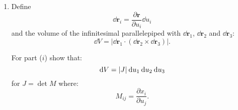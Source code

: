\begin{enumerate}
\begin{proof}
    \newpage

    Then multiply both sides by $\ell_{in}$:
    $$T'_{ijk}\ell_{jk}\ell_{km}\ell_{in}=
    \ell_{ij}\ell_{in}T_{jkm}.$$
    $$\therefore T'_{ijk}\ell_{jk}\ell_{km}\ell_{in}=
    \delta_{jn}T_{jkm}$$
    $$\therefore T'_{ijk}\ell_{jk}\ell_{km}\ell_{in}=T_{nkm}$$
    $$\therefore T'_{ijk}\ell_{in}\ell_{jk}\ell_{km}=T_{nkm}$$
    And this is by definition a third rank tensor.
    \end{proof}
    
    \newpage

    \item Define
    $$\dd\boldsymbol{r}_i=\frac{\partial\boldsymbol{r}}
    {\partial u_i}\dd u_i$$
    and the volume of the infinitesimal parallelepiped with $\dd\boldsymbol{r}_1$,
    $\dd\boldsymbol{r}_2$ and $\dd\boldsymbol{r}_3$:
    $$\dd V=|\dd\boldsymbol{r}_1\cdot
    (\dd\boldsymbol{r}_2\times\dd\boldsymbol{r}_3)|.$$

    For part ($i$) show that:
    $$\dd V=|J|\hspace{0.03in}\dd u_1\hspace{0.03in}\dd u_2\hspace{0.03in}\dd u_3$$
    for $J=\det M$ where:
    $$M_{ij}=\frac{\partial x_i}{\partial u_j}.$$ \\


\end{enumerate}
